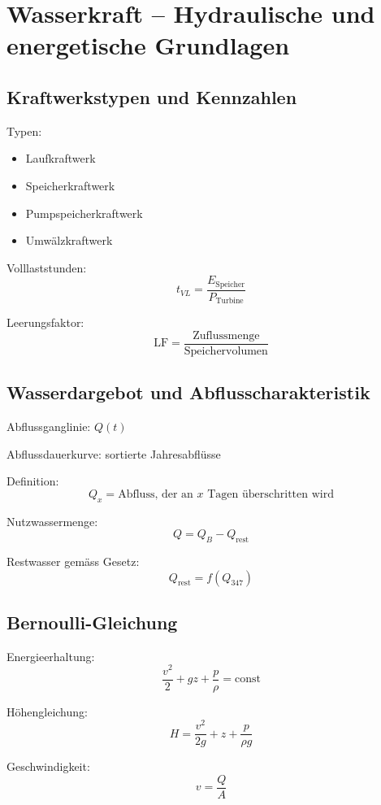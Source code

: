 \section{Wasserkraft – Hydraulische und energetische Grundlagen}

\subsection{Kraftwerkstypen und Kennzahlen}

Typen:
\begin{itemize}
\item Laufkraftwerk
\item Speicherkraftwerk
\item Pumpspeicherkraftwerk
\item Umwälzkraftwerk
\end{itemize}

Volllaststunden:
\[
t_{VL} = \frac{E_{\text{Speicher}}}{P_{\text{Turbine}}}
\]

Leerungsfaktor:
\[
\text{LF} = \frac{\text{Zuflussmenge}}{\text{Speichervolumen}}
\]

\subsection{Wasserdargebot und Abflusscharakteristik}

Abflussganglinie: $Q(t)$

Abflussdauerkurve: sortierte Jahresabflüsse

Definition:
\[
Q_x = \text{Abfluss, der an } x \text{ Tagen überschritten wird}
\]

Nutzwassermenge:
\[
Q = Q_B - Q_{\text{rest}}
\]

Restwasser gemäss Gesetz:
\[
Q_{\text{rest}} = f(Q_{347})
\]

\subsection{Bernoulli-Gleichung}

Energieerhaltung:
\[
\frac{v^2}{2} + g z + \frac{p}{\rho} = \text{const}
\]

Höhengleichung:
\[
H = \frac{v^2}{2g} + z + \frac{p}{\rho g}
\]

Geschwindigkeit:
\[
v = \frac{Q}{A}
\]

